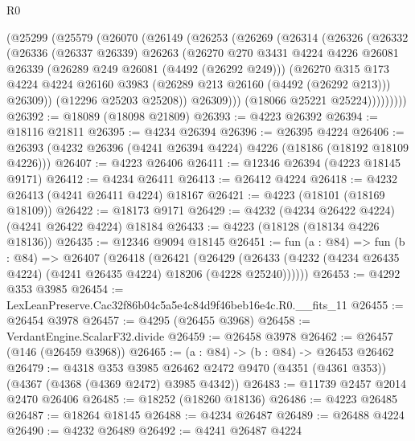 \begin{lexlean}{R0}
\begin{coremodule}
        (@25299
          (@25579
            (@26070
              (@26149
                (@26253
                  (@26269
                    (@26314
                      (@26326
                        (@26332
                          (@26336
                            (@26337 @26339)
                            @26263
                            (@26270
                              @270
                              @3431
                              @4224
                              @4226
                              @26081
                              @26339
                              (@26289 @249 @26081 (@4492 (@26292 @249)))
                              (@26270
                                @315
                                @173
                                @4224
                                @4224
                                @26160
                                @3983
                                (@26289 @213 @26160 (@4492 (@26292 @213)))
                                @26309))
                            (@12296 @25203 @25208))
                          @26309)))
                    (@18066 @25221 @25224)))))))))
@26392 := @18089 (@18098 @21809)
@26393 := @4223 @26392
@26394 := @18116 @21811
@26395 := @4234 @26394
@26396 := @26395 @4224
@26406 := @26393 (@4232 @26396 (@4241 @26394 @4224) @4226 (@18186 (@18192 @18109 @4226)))
@26407 := @4223 @26406
@26411 := @12346 @26394 (@4223 @18145 @9171)
@26412 := @4234 @26411
@26413 := @26412 @4224
@26418 := @4232 @26413 (@4241 @26411 @4224) @18167
@26421 := @4223 (@18101 (@18169 @18109))
@26422 := @18173 @9171
@26429 := @4232 (@4234 @26422 @4224) (@4241 @26422 @4224) @18184
@26433 := @4223 (@18128 (@18134 @4226 @18136))
@26435 := @12346 @9094 @18145
@26451 := fun (a : @84) =>
  fun (b : @84) =>
  @26407
    (@26418
      (@26421
        (@26429 (@26433 (@4232 (@4234 @26435 @4224) (@4241 @26435 @4224) @18206 (@4228 @25240))))))
@26453 := @4292 @353 @3985
@26454 := LexLeanPreserve.Cac32f86b04c5a5e4c84d9f46beb16e4c.R0.__fits_11
@26455 := @26454 @3978
@26457 := @4295 (@26455 @3968)
@26458 := VerdantEngine.ScalarF32.divide
@26459 := @26458 @3978
@26462 := @26457 (@146 (@26459 @3968))
@26465 := (a : @84) -> (b : @84) -> @26453 @26462
@26479 := @4318
    @353
    @3985
    @26462
    @2472
    @9470
    (@4351 (@4361 @353))
    (@4367 (@4368 (@4369 @2472) @3985 @4342))
@26483 := @11739 @2457 @2014 @2470 @26406
@26485 := @18252 (@18260 @18136)
@26486 := @4223 @26485
@26487 := @18264 @18145
@26488 := @4234 @26487
@26489 := @26488 @4224
@26490 := @4232 @26489
@26492 := @4241 @26487 @4224

\end{coremodule}
\end{lexlean}
